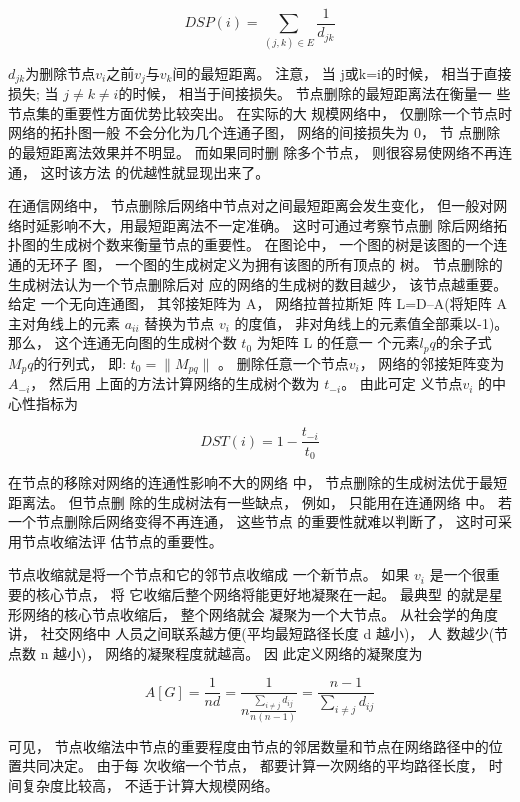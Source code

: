 $$DSP(i)=\sum\limits_{(j,k)\in E} {\frac{1}{d_{jk}}}$$
				

				$d_{jk}$为删除节点$v_i$之前$v_j$与$v_k$间的最短距离。 注意， 当 j或k=i的时候， 相当于直接损失; 当 $j\ne k\ne i$的时候， 相当于间接损失。 节点删除的最短距离法在衡量一 些节点集的重要性方面优势比较突出。 在实际的大 规模网络中， 仅删除一个节点时网络的拓扑图一般 不会分化为几个连通子图， 网络的间接损失为 0， 节 点删除的最短距离法效果并不明显。 而如果同时删 除多个节点， 则很容易使网络不再连通， 这时该方法 的优越性就显现出来了。

			在通信网络中， 节点删除后网络中节点对之间最短距离会发生变化， 但一般对网络时延影响不大，用最短距离法不一定准确。 这时可通过考察节点删 除后网络拓扑图的生成树个数来衡量节点的重要性。 在图论中， 一个图的树是该图的一个连通的无环子 图， 一个图的生成树定义为拥有该图的所有顶点的 树。 节点删除的生成树法\parencite{cy2004tx}认为一个节点删除后对 应的网络的生成树的数目越少， 该节点越重要。 给定 一个无向连通图， 其邻接矩阵为 A， 网络拉普拉斯矩 阵 L=D–A(将矩阵 A 主对角线上的元素 $a_{ii}$ 替换为节点 $v_i$ 的度值， 非对角线上的元素值全部乘以-1)。 那么， 这个连通无向图的生成树个数 $t_0$ 为矩阵 L 的任意一 个元素$l_pq$的余子式$M_pq$的行列式， 即: $t_0 = \|M_{pq}\|$ 。 删除任意一个节点$v_i$， 网络的邻接矩阵变为$A_{-i}$， 然后用 上面的方法计算网络的生成树个数为 $t_{-i}$。 由此可定 义节点$v_i$ 的中心性指标为

				$$DST(i)=1-\frac{t_{-i}}{t_0}$$

				在节点的移除对网络的连通性影响不大的网络 中， 节点删除的生成树法优于最短距离法。 但节点删 除的生成树法有一些缺点， 例如， 只能用在连通网络 中。 若一个节点删除后网络变得不再连通， 这些节点 的重要性就难以判断了， 这时可采用节点收缩法评 估节点的重要性。

				节点收缩就是将一个节点和它的邻节点收缩成 一个新节点\parencite{tyj2006fz}。 如果 $v_i$ 是一个很重要的核心节点， 将 它收缩后整个网络将能更好地凝聚在一起。 最典型 的就是星形网络的核心节点收缩后， 整个网络就会 凝聚为一个大节点。 从社会学的角度讲， 社交网络中 人员之间联系越方便(平均最短路径长度 d 越小)， 人 数越少(节点数 n 越小)， 网络的凝聚程度就越高。 因 此定义网络的凝聚度为

				$$A[G]=\frac {1}{nd}=\frac{1}{n \frac{\sum\limits_{i\ne j} {d_{ij}}} {n(n-1)}} = \frac{n-1}{\sum\limits_{i\ne j} {d_{ij}}}$$

				可见， 节点收缩法中节点的重要程度由节点的邻居数量和节点在网络路径中的位置共同决定。 由于每 次收缩一个节点， 都要计算一次网络的平均路径长度， 时间复杂度比较高， 不适于计算大规模网络。

